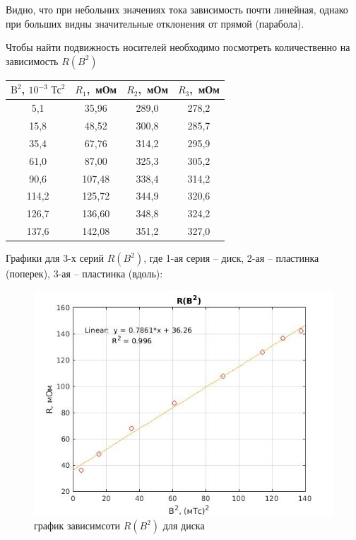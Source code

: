 \documentclass[a4paper, 12pt]{article}%
\begin{document}
Видно, что при небольних значениях тока зависимость почти линейная, однако при больших видны значительные отклонения от прямой (парабола). 

Чтобы найти подвижность носителей необходимо посмотреть количественно на зависимость $R(B^2)$

\begin{table}[!h]
\begin{center}
\begin{tabular}{|c|c|c|c|}
\hline $\mathrm{B}^{2}$, $10^{-3} \text{ Тс}^2$ & $R_1$,\ мОм & $R_2$,\ мОм  & $R_3$,\ мОм  \\
\hline 5,1   & 35,96  & 289,0 & 278,2 \\
\hline 15,8  & 48,52  & 300,8 & 285,7 \\
\hline 35,4  & 67,76  & 314,2 & 295,9 \\
\hline 61,0  & 87,00  & 325,3 & 305,2 \\
\hline 90,6  & 107,48 & 338,4 & 314,2 \\
\hline 114,2 & 125,72 & 344,9 & 320,6 \\
\hline 126,7 & 136,60 & 348,8 & 324,2 \\
\hline 137,6 & 142,08 & 351,2 & 327,0 \\
\hline
\end{tabular}
\end{center}
\end{table}

Графики для 3-х серий $R(B^2)$, где 1-ая серия -- диск, 2-ая -- пластинка (поперек), 3-ая -- пластинка (вдоль):


\begin{center}
\begin{figure}[!h]
    \centering
    \includegraphics[width = 10 cm]{graph1(disk).jpg}
    \caption{график зависимсоти $R(B^2)$ для диска}
    \label{ser1}
\end{figure}
\end{center}
\end{document}
